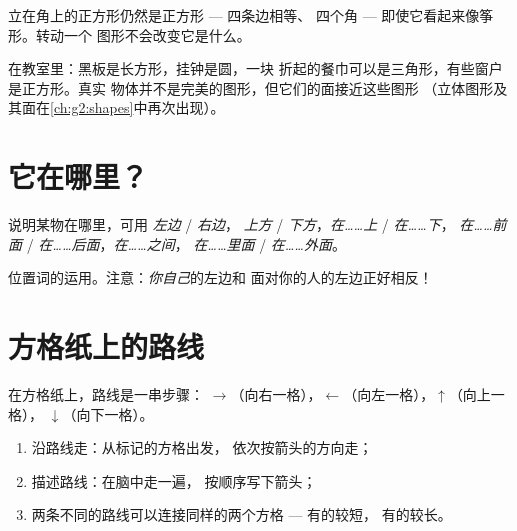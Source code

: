 \begin{example}[倾斜的图形仍是图形]\label{ex:g1:shapes:tilted}
立在角上的正方形仍然是正方形 --- 四条边相等、
四个角 --- 即使它看起来像筝形。转动一个
图形不会改变它是什么。
\end{example}

\begin{example}[找图形]\label{ex:g1:shapes:hunt}
在教室里：黑板是长方形，挂钟是圆，一块
折起的餐巾可以是三角形，有些窗户是正方形。真实
物体并不是完美的图形，但它们的面接近这些图形
（立体图形及其面在\cref{ch:g2:shapes}中再次出现）。
\end{example}

\section{它在哪里？}

\begin{definition}[位置词]\label{def:g1:shapes:position}
说明某物在哪里，可用 \emph{左边} / \emph{右边}，
\emph{上方} / \emph{下方}，\emph{在……上} / \emph{在……下}，
\emph{在……前面} / \emph{在……后面}，\emph{在……之间}，
\emph{在……里面} / \emph{在……外面}。
\end{definition}

\begin{omfigure}

{\small 位置词的运用。注意：\emph{你自己}的左边和
面对你的人的左边正好相反！}
\end{omfigure}

\section{方格纸上的路线}

\begin{method}[描述路线]\label{met:g1:shapes:path}
在方格纸上，路线是一串步骤：
$\to$（向右一格），$\leftarrow$（向左一格），$\uparrow$（向上一格），
$\downarrow$（向下一格）。
\begin{enumerate}
  \item 沿路线走：从标记的方格出发，
        依次按箭头的方向走；
  \item 描述路线：在脑中走一遍，
        按顺序写下箭头；
  \item 两条不同的路线可以连接同样的两个方格 --- 有的较短，
        有的较长。
\end{enumerate}
\end{method}

